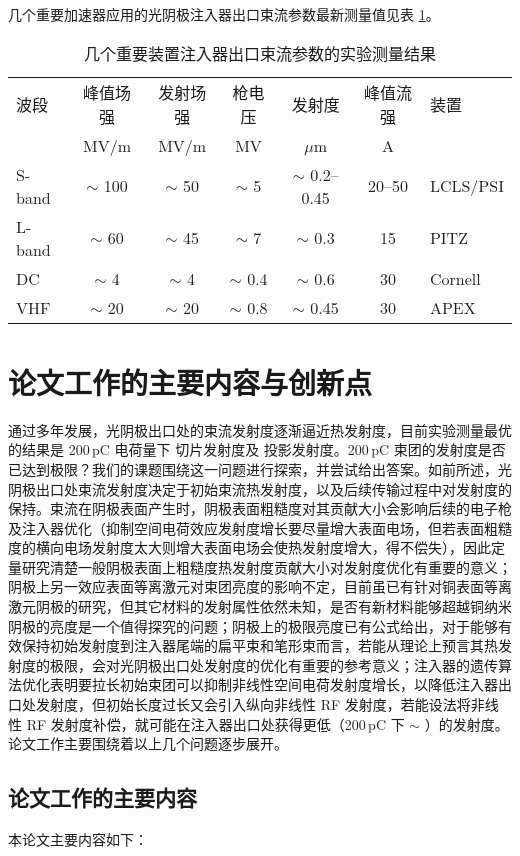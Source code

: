 几个重要加速器应用的光阴极注入器出口束流参数最新测量值见表 \ref{tab:record-emit}。
\begin{table}[htbp]
\caption{几个重要装置注入器出口束流参数的实验测量结果}
\label{tab:record-emit}
\centering
\begin{tabular}{lcccccl}
\toprule
波段 & 峰值场强 & 发射场强 & 枪电压 & 发射度 & 峰值流强 & 装置 \\
 & MV/m & MV/m & MV & $\mu$m & A & \\
\midrule
S-band & $\sim$ 100 & $\sim$ 50 & $\sim$ 5 & $\sim$ 0.2--0.45 & 20--50 & LCLS/PSI \\
L-band & $\sim$ 60 & $\sim$ 45 & $\sim$ 7 & $\sim$ 0.3 & 15 & PITZ \\
DC & $\sim$ 4 & $\sim$ 4 & $\sim$ 0.4 & $\sim$ 0.6 & 30 & Cornell \\
VHF & $\sim$ 20 & $\sim$ 20 & $\sim$ 0.8 & $\sim$ 0.45 & 30 & APEX \\
\bottomrule
\end{tabular}
\end{table}

\section{论文工作的主要内容与创新点}
通过多年发展，光阴极出口处的束流发射度逐渐逼近热发射度，目前实验测量最优的结果是 200\,pC 电荷量下  切片发射度及  投影发射度。200\,pC 束团的发射度是否已达到极限？我们的课题围绕这一问题进行探索，并尝试给出答案。如前所述，光阴极出口处束流发射度决定于初始束流热发射度，以及后续传输过程中对发射度的保持。束流在阴极表面产生时，阴极表面粗糙度对其贡献大小会影响后续的电子枪及注入器优化（抑制空间电荷效应发射度增长要尽量增大表面电场，但若表面粗糙度的横向电场发射度太大则增大表面电场会使热发射度增大，得不偿失），因此定量研究清楚一般阴极表面上粗糙度热发射度贡献大小对发射度优化有重要的意义；阴极上另一效应表面等离激元对束团亮度的影响不定，目前虽已有针对铜表面等离激元阴极的研究，但其它材料的发射属性依然未知，是否有新材料能够超越铜纳米阴极的亮度是一个值得探究的问题；阴极上的极限亮度已有公式给出，对于能够有效保持初始发射度到注入器尾端的扁平束和笔形束而言，若能从理论上预言其热发射度的极限，会对光阴极出口处发射度的优化有重要的参考意义；注入器的遗传算法优化表明要拉长初始束团可以抑制非线性空间电荷发射度增长，以降低注入器出口处发射度，但初始长度过长又会引入纵向非线性 RF 发射度，若能设法将非线性 RF 发射度补偿，就可能在注入器出口处获得更低（200\,pC 下 $\sim$ ）的发射度。论文工作主要围绕着以上几个问题逐步展开。

\subsection{论文工作的主要内容}
本论文主要内容如下：

